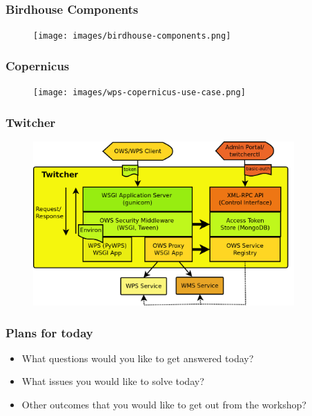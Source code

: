 \documentclass{beamer}
\begin{document}

  \begin{frame}
    \frametitle{Birdhouse Components}
    \begin{figure}
      \texttt{[image: images/birdhouse-components.png]}
    \end{figure}
  \end{frame}


  \begin{frame}
    \frametitle{Copernicus}
    \begin{figure}
      \texttt{[image: images/wps-copernicus-use-case.png]}
    \end{figure}
  \end{frame}


  \begin{frame}
    \frametitle{Twitcher}
    \begin{figure}
      \includegraphics[width=10cm]{images/twitcher-overview.png}
    \end{figure}
  \end{frame}


   \begin{frame}
    \frametitle{Plans for today}
    \begin{itemize}
      \item What questions would you like to get answered today?
      \item What issues you would like to solve today?
      \item Other outcomes that you would like to get out from the workshop? 
    \end{itemize}
  \end{frame}
\end{document}
